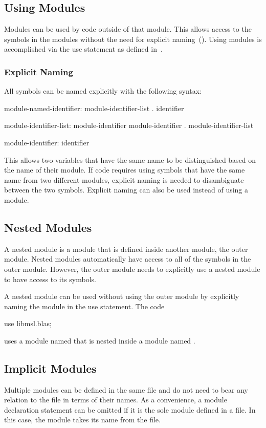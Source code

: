 \subsection{Using Modules}
\label{Using_Modules}

Modules can be used by code outside of that module.  This allows
access to the symbols in the modules without the need for explicit
naming~().  Using modules is accomplished via
the use statement as defined in~.

\subsubsection{Explicit Naming}
\label{Explicit_Naming}

All symbols can be named explicitly with the following syntax:
\begin{syntax}
module-named-identifier:
  module-identifier-list . identifier

module-identifier-list:
  module-identifier
  module-identifier . module-identifier-list

module-identifier:
  identifier
\end{syntax}
This allows two variables that have the same name to be distinguished
based on the name of their module.  If code requires using symbols
that have the same name from two different modules, explicit naming is
needed to disambiguate between the two symbols.  Explicit naming can
also be used instead of using a module.

\subsection{Nested Modules}
\label{Nested_Modules}

A nested module is a module that is defined inside another module, the
outer module.  Nested modules automatically have access to all of the
symbols in the outer module.  However, the outer module needs to
explicitly use a nested module to have access to its symbols.

\begin{example}
A nested module can be used without using the outer module by
explicitly naming the module in the use statement.  The code
\begin{chapel}
use libmsl.blas;
\end{chapel}
uses a module named  that is nested inside a module
named .
\end{example}

\subsection{Implicit Modules}
\label{Implicit_Modules}

Multiple modules can be defined in the same file and do not need to
bear any relation to the file in terms of their names.  As a
convenience, a module declaration statement can be omitted if it is
the sole module defined in a file.  In this case, the module takes its
name from the file.
